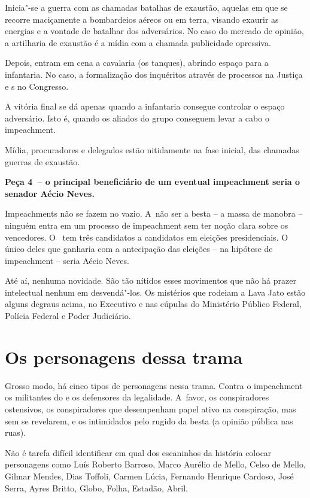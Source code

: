 Inicia"-se a guerra com as chamadas batalhas de exaustão, aquelas em que
se recorre maciçamente a bombardeios aéreos ou em terra, visando exaurir
as energias e a vontade de batalhar dos adversários. No caso do mercado
de opinião, a artilharia de exaustão é a mídia com a chamada publicidade
opressiva.

Depois, entram em cena a cavalaria (os tanques), abrindo espaço para a
infantaria. No caso, a formalização dos inquéritos através de processos
na Justiça e s no Congresso.

A vitória final se dá apenas quando a infantaria consegue controlar o
espaço adversário. Isto é, quando os aliados do grupo conseguem levar a
cabo o impeachment.

Mídia, procuradores e delegados estão nitidamente na fase inicial, das
chamadas guerras de exaustão.

\textbf{Peça 4~-- o principal beneficiário de um eventual impeachment
seria o senador Aécio Neves.}

Impeachments não se fazem no vazio. A~não ser a besta -- a massa de
manobra -- ninguém entra em um processo de impeachment sem ter noção
clara sobre os vencedores. O~ tem três candidatos a candidatos em
eleições presidenciais. O único deles que ganharia com a antecipação das
eleições -- na hipótese de impeachment -- seria Aécio Neves.

Até aí, nenhuma novidade. São tão nítidos esses movimentos que não há
prazer intelectual nenhum em desvendá"-los. Os mistérios que rodeiam a
Lava Jato estão alguns degraus acima, no Executivo e nas cúpulas do
Ministério Público Federal, Polícia Federal e Poder Judiciário.

\section{Os personagens dessa trama}

Grosso modo, há cinco tipos de personagens nessa trama. Contra o
impeachment os militantes do  e os defensores da legalidade. A~favor,
os conspiradores ostensivos, os conspiradores que desempenham papel
ativo na conspiração, mas sem se revelarem, e os intimidados pelo rugido
da besta (a opinião pública nas ruas).

Não é tarefa difícil identificar em qual dos escaninhos da história
colocar personagens como Luís Roberto Barroso, Marco Aurélio de Mello,
Celso de Mello, Gilmar Mendes, Dias Toffoli, Carmen Lúcia, Fernando
Henrique Cardoso, José Serra, Ayres Britto, Globo, Folha, Estadão,
Abril.

